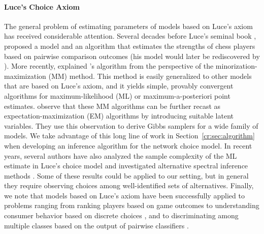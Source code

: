 \paragraph{Luce's Choice Axiom}
The general problem of estimating parameters of models based on Luce's axiom has received considerable attention.
Several decades before Luce's seminal book \citep{luce1959individual}, \citet{zermelo1928berechnung} proposed a model and an algorithm that estimates the strengths of chess players based on pairwise comparison outcomes (his model would later be rediscovered by \citet{bradley1952rank}).
More recently, \citet{hunter2004mm} explained \citeauthor{zermelo1928berechnung}'s algorithm from the perspective of the minorization-maximization (MM) method.
This method is easily generalized to other models that are based on Luce's axiom, and it yields simple, provably convergent algorithms for maximum-likelihood (ML) or maximum-a-posteriori point estimates.
\citet{caron2012efficient} observe that these MM algorithms can be further recast as expectation-maximization (EM) algorithms by introducing suitable latent variables.
They use this observation to derive Gibbs samplers for a wide family of models.
We take advantage of this long line of work in Section~\ref{cr:sec:algorithm} when developing an inference algorithm for the network choice model.
In recent years, several authors have also analyzed the sample complexity of the ML estimate in Luce's choice model \citep{hajek2014minimax, vojnovic2016parameter} and investigated alternative spectral inference methods \citep{negahban2012iterative, azari2013generalized, maystre2015fast}.
Some of these results could be applied to our setting, but in general they require observing choices among well-identified sets of alternatives.
Finally, we note that models based on Luce's axiom have been successfully applied to problems ranging from ranking players based on game outcomes \citep{zermelo1928berechnung, elo1978rating} to understanding consumer behavior based on discrete choices \citep{mcfadden1973conditional}, and to discriminating among multiple classes based on the output of pairwise classifiers \citep{hastie1998classification}.

